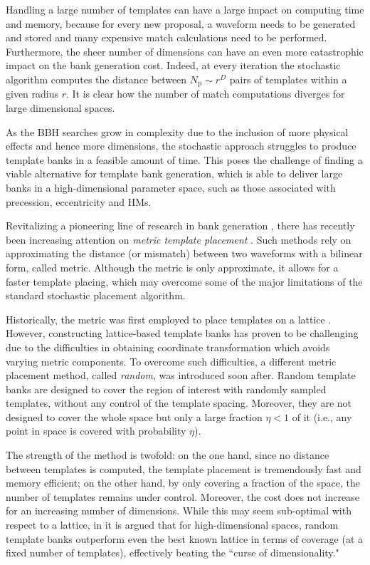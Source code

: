 \documentclass[twocolumn,showpacs,preprintnumbers,nofootinbib,prd,
superscriptaddress,10pt]{revtex4-2}
\begin{document}
Handling a large number of templates can have a large impact on computing time and memory, because for every new proposal, a waveform needs to be generated and stored and many expensive match calculations need to be performed.
Furthermore, the sheer number of dimensions can have an even more catastrophic impact on the bank generation cost. Indeed, at every iteration the stochastic algorithm computes the distance between $N_\text{p}\sim r^D$ pairs of templates within a given radius $r$. It is clear how the number of match computations diverges for large dimensional spaces.

As the BBH searches grow in complexity due to the inclusion of more physical effects and hence more dimensions, the stochastic approach struggles to produce template banks in a feasible amount of time.
This poses the challenge of finding a viable alternative for template bank generation, which is able to deliver large banks in a high-dimensional parameter space, such as those associated with precession, eccentricity and HMs.

Revitalizing a pioneering line of research in bank generation \cite{owen_metric, Messenger:2008ta, Prix:2007ks, Brown:2012qf, Keppel:2012ye}, there has recently been increasing attention on {\it metric template placement} \cite{Roy:2017oul, Roulet:2019hzy, Coogan:2022qxs, Hanna:2022zpk}.
Such methods rely on approximating the distance (or mismatch) between two waveforms with a bilinear form, called metric.
Although the metric is only approximate, it allows for a faster template placing, which may overcome some of the major limitations of the standard stochastic placement algorithm.

Historically, the metric was first employed to place templates on a lattice \cite{owen_metric, Prix:2007ks, Cokelaer:2007kx}. However, constructing lattice-based template banks has proven to be challenging due to the difficulties in  obtaining coordinate transformation which avoids varying metric components.
To overcome such difficulties, a different metric placement method, called {\it random}, was introduced \cite{Messenger:2008ta} soon after.
Random template banks are designed to cover the region of interest with randomly sampled templates, without any control of the template spacing. 
Moreover, they are not designed to cover the whole space but only a large fraction $\eta<1$ of it (i.e., any point in space is covered with probability $\eta$).

The strength of the method is twofold: on the one hand, since no distance between templates is computed, the template placement is tremendously fast and memory efficient; on the other hand, by only covering a fraction of the space, the number of templates remains under control.
Moreover, the cost does not increase for an increasing number of dimensions.
While this may seem sub-optimal with respect to a lattice, in \cite{Messenger:2008ta, Allen:2022lqr, Allen:2021yuy} it is argued that for high-dimensional spaces, random template banks outperform even the best known lattice in terms of coverage (at a fixed number of templates), effectively beating the ``curse of dimensionality."
\end{document}
